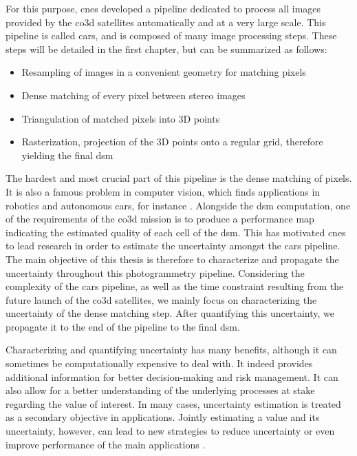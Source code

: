 For this purpose, \acrshort{cnes} developed a pipeline dedicated to process all images provided by the \acrshort{co3d} satellites automatically and at a very large scale. This pipeline is called \acrfull{cars}, and is composed of many image processing steps. These steps will be detailed in the first chapter, but can be summarized as follows:
\begin{itemize}
    \item Resampling of images in a convenient geometry for matching pixels
    \item Dense matching of every pixel between stereo images
    \item Triangulation of matched pixels into 3D points
    \item Rasterization, \ie projection of the 3D points onto a regular grid, therefore yielding the final \acrshort{dsm} 
\end{itemize}
The hardest and most crucial part of this pipeline is the dense matching of pixels. It is also a famous problem in computer vision, which finds applications in robotics and autonomous cars, for instance \cite{geiger_vision_2013}. Alongside the \acrshort{dsm} computation, one of the requirements of the \acrshort{co3d} mission is to produce a performance map indicating the estimated quality of each cell of the \acrshort{dsm}. This has motivated \acrshort{cnes} to lead research in order to estimate the uncertainty amongst the \acrshort{cars} pipeline. The main objective of this thesis is therefore to characterize and propagate the uncertainty throughout this photogrammetry pipeline. Considering the complexity of the \acrshort{cars} pipeline, as well as the time constraint resulting from the future launch of the \acrshort{co3d} satellites, we mainly focus on characterizing the uncertainty of the dense matching step. After quantifying this uncertainty, we propagate it to the end of the pipeline to the final \acrshort{dsm}.

Characterizing and quantifying uncertainty has many benefits, although it can sometimes be computationally expensive to deal with. It indeed provides additional information for better decision-making and risk management. It can also allow for a better understanding of the underlying processes at stake regarding the value of interest. In many cases, uncertainty estimation is treated as a secondary objective in applications. Jointly estimating a value and its uncertainty, however, can lead to new strategies to reduce uncertainty or even improve performance of the main applications \cite{qin_uncertainty-guided_2022,chen_learning_2023,jiang_unsupervised_2024}.


